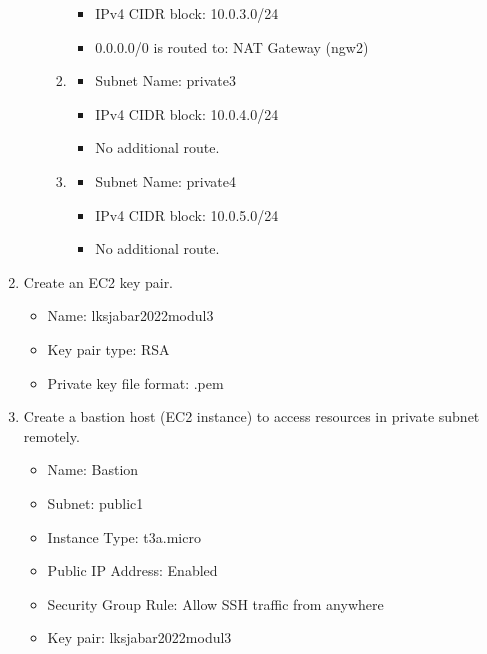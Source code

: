 \documentclass{article}
\begin{document}
\begin{enumerate}
\begin{itemize}
\begin{enumerate}
\begin{itemize}
                \item IPv4 CIDR block: 10.0.3.0/24
                \item 0.0.0.0/0 is routed to: NAT Gateway (ngw2) 
            \end{itemize}
            \vspace{5mm} 
            \item 
            \begin{itemize}
                \item Subnet Name: private3
                \item IPv4 CIDR block: 10.0.4.0/24
                \item No additional route.
            \end{itemize}
            \vspace{5mm} 
            \item 
            \begin{itemize}
                \item Subnet Name: private4
                \item IPv4 CIDR block: 10.0.5.0/24
                \item No additional route.
            \end{itemize}
        \end{enumerate}
    \end{itemize}
    \item Create an EC2 key pair.
    \begin{itemize}
        \item Name: lksjabar2022modul3
        \item Key pair type: RSA
        \item Private key file format: .pem
    \end{itemize}
    \item Create a bastion host (EC2 instance) to access resources in private subnet remotely.
        \begin{itemize}
            \item Name: Bastion
            \item Subnet: public1
            \item Instance Type: t3a.micro
            \item Public IP Address: Enabled
            \item Security Group Rule: Allow SSH traffic from anywhere
            \item Key pair: lksjabar2022modul3
        \end{itemize}

\end{enumerate}
\end{document}
